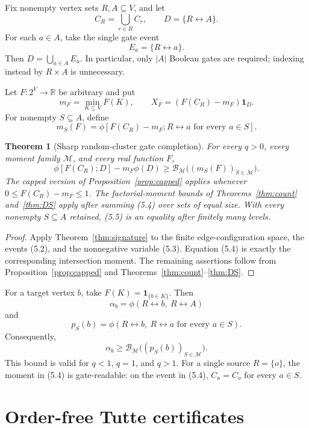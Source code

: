 \documentclass[11pt]{article}
\newtheorem{theorem}{Theorem}[section]
\theoremstyle{definition}
\theoremstyle{remark}
\newcommand{\one}{\mathbf 1}
\newcommand{\cM}{\mathcal M}
\newcommand{\cB}{\mathcal B}
\newcommand{\RC}{\phi}
\begin{document}
Fix nonempty vertex sets $R,A\subseteq V$, and let
\[
 C_R=\bigcup_{r\in R}C_r,
 \qquad D=\{R\leftrightarrow A\}.
\]
For each $a\in A$, take the single gate event
\[
 E_a=\{R\leftrightarrow a\}.
 \tag{5.2}
\]
Then $D=\bigcup_{a\in A}E_a$.  In particular, only $|A|$ Boolean gates
are required; indexing instead by $R\times A$ is unnecessary.

Let $F:2^V\to\mathbb R$ be arbitrary and put
\[
 m_F=\min_{K\subseteq V}F(K),\qquad
 X_F=(F(C_R)-m_F)\one_D.
 \tag{5.3}
\]
For nonempty $S\subseteq A$, define
\[
 m_S(F)=\RC\left[F(C_R)-m_F;
 R\leftrightarrow a\text{ for every }a\in S\right].
 \tag{5.4}
\]

\begin{theorem}[Sharp random-cluster gate completion]\label{thm:RC}
For every $q>0$, every moment family $\cM$, and every real function $F$,
\[
 \boxed{
 \RC[F(C_R);D]-m_F\RC(D)
 \geq \cB_{\cM}\bigl((m_S(F))_{S\in\cM}\bigr).}
 \tag{5.5}
\]
The capped version of Proposition~\ref{prop:capped} applies whenever
$0\leq F(C_R)-m_F\leq1$.  The factorial-moment bounds of
Theorems~\ref{thm:count} and~\ref{thm:DS} apply after summing (5.4) over
sets of equal size.  With every nonempty $S\subseteq A$ retained, (5.5) is
an equality after finitely many levels.
\end{theorem}

\begin{proof}
Apply Theorem~\ref{thm:signature} to the finite edge-configuration space,
the events (5.2), and the nonnegative variable (5.3).  Equation (5.4) is
exactly the corresponding intersection moment.  The remaining assertions
follow from Proposition~\ref{prop:capped} and
Theorems~\ref{thm:count}--\ref{thm:DS}.
\end{proof}

For a target vertex $b$, take $F(K)=\one_{\{b\in K\}}$.  Then
\[
 \alpha_b=\RC(R\leftrightarrow b,\ R\leftrightarrow A)
\]
and
\[
 p_S(b)=\RC(R\leftrightarrow b,\ R\leftrightarrow a
              \text{ for every }a\in S).
 \tag{5.6}
\]
Consequently,
\[
 \boxed{\alpha_b\geq\cB_{\cM}\bigl((p_S(b))_{S\in\cM}\bigr).}
 \tag{5.7}
\]
This bound is valid for $q<1$, $q=1$, and $q>1$.  For a single source
$R=\{o\}$, the moment in (5.4) is gate-readable: on the event in (5.4),
$C_a=C_o$ for every $a\in S$.

\section{Order-free Tutte certificates}
\end{document}
